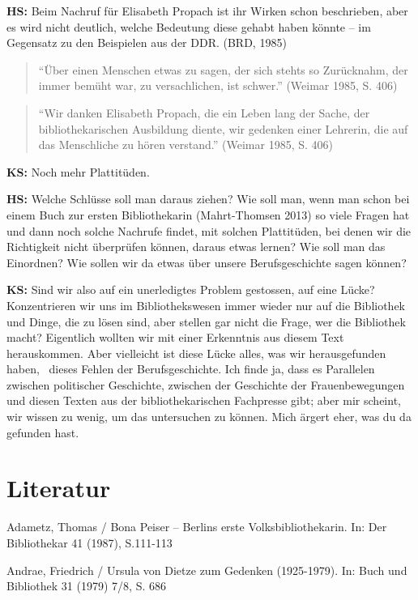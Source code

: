 \documentclass[a4paper,
fontsize=11pt,
oneside,
numbers=noperiodatend,
parskip=half-,
bibliography=totoc,
final
]{scrartcl}
\begin{document}
\textbf{HS:} Beim Nachruf für Elisabeth Propach ist ihr Wirken schon
beschrieben, aber es wird nicht deutlich, welche Bedeutung diese gehabt
haben könnte -- im Gegensatz zu den Beispielen aus der DDR. (BRD, 1985)

\begin{quote}
\enquote{Über einen Menschen etwas zu sagen, der sich stehts so
Zurücknahm, der immer bemüht war, zu versachlichen, ist schwer.} (Weimar
1985, S. 406)
\end{quote}

\begin{quote}
\enquote{Wir danken Elisabeth Propach, die ein Leben lang der Sache, der
bibliothekarischen Ausbildung diente, wir gedenken einer Lehrerin, die
auf das Menschliche zu hören verstand.} (Weimar 1985, S. 406)
\end{quote}

\textbf{KS:} Noch mehr Plattitüden.

\textbf{HS:} Welche Schlüsse soll man daraus ziehen? Wie soll man, wenn
man schon bei einem Buch zur ersten Bibliothekarin (Mahrt-Thomsen 2013)
so viele Fragen hat und dann noch solche Nachrufe findet, mit solchen
Plattitüden, bei denen wir die Richtigkeit nicht überprüfen können,
daraus etwas lernen? Wie soll man das Einordnen? Wie sollen wir da etwas
über unsere Berufsgeschichte sagen können?

\textbf{KS:} Sind wir also auf ein unerledigtes Problem gestossen, auf
eine Lücke? Konzentrieren wir uns im Bibliothekswesen immer wieder nur
auf die Bibliothek und Dinge, die zu lösen sind, aber stellen gar nicht
die Frage, wer die Bibliothek macht? Eigentlich wollten wir mit einer
Erkenntnis aus diesem Text herauskommen. Aber vielleicht ist diese Lücke
alles, was wir herausgefunden haben,~ dieses Fehlen der
Berufsgeschichte. Ich finde ja, dass es Parallelen zwischen politischer
Geschichte, zwischen der Geschichte der Frauenbewegungen und diesen
Texten aus der bibliothekarischen Fachpresse gibt; aber mir scheint, wir
wissen zu wenig, um das untersuchen zu können. Mich ärgert eher, was du
da gefunden hast.

\section*{Literatur}\label{literatur}

Adametz, Thomas / Bona Peiser -- Berlins erste Volksbibliothekarin. In:
Der Bibliothekar 41 (1987), S.111-113

Andrae, Friedrich / Ursula von Dietze zum Gedenken (1925-1979). In: Buch
und Bibliothek 31 (1979) 7/8, S. 686
\end{document}
